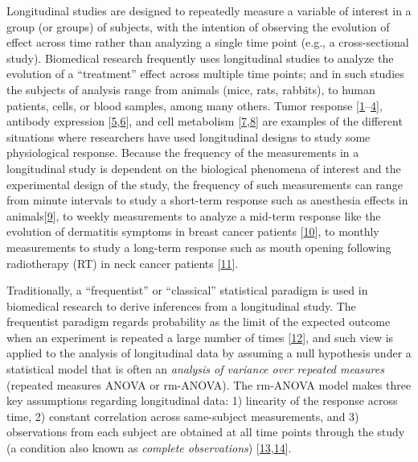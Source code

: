 \documentclass[
]{article}
\begin{document}
Longitudinal studies are designed to repeatedly measure a variable of interest in a group (or groups) of subjects, with the intention of observing the evolution of effect across time rather than analyzing a single time point (e.g., a cross-sectional study). Biomedical research frequently uses longitudinal studies to analyze the evolution of a ``treatment'' effect across multiple time points; and in such studies the subjects of analysis range from animals (mice, rats, rabbits), to human patients, cells, or blood samples, among many others. Tumor response {[}\protect\hyperlink{ref-roblyer2011}{1}--\protect\hyperlink{ref-demidov2018}{4}{]}, antibody expression {[}\protect\hyperlink{ref-ritter2001}{5},\protect\hyperlink{ref-roth2017}{6}{]}, and cell metabolism {[}\protect\hyperlink{ref-jones2018}{7},\protect\hyperlink{ref-skala2010}{8}{]} are examples of the different situations where researchers have used longitudinal designs to study some physiological response. Because the frequency of the measurements in a longitudinal study is dependent on the biological phenomena of interest and the experimental design of the study, the frequency of such measurements can range from minute intervals to study a short-term response such as anesthesia effects in animals{[}\protect\hyperlink{ref-greening2018}{9}{]}, to weekly measurements to analyze a mid-term response like the evolution of dermatitis symptoms in breast cancer patients {[}\protect\hyperlink{ref-sio2016}{10}{]}, to monthly measurements to study a long-term response such as mouth opening following radiotherapy (RT) in neck cancer patients {[}\protect\hyperlink{ref-kamstra2015}{11}{]}.

Traditionally, a ``frequentist'' or ``classical'' statistical paradigm is used in biomedical research to derive inferences from a longitudinal study. The frequentist paradigm regards probability as the limit of the expected outcome when an experiment is repeated a large number of times {[}\protect\hyperlink{ref-wagenmakers2008}{12}{]}, and such view is applied to the analysis of longitudinal data by assuming a null hypothesis under a statistical model that is often an \emph{analysis of variance over repeated measures} (repeated measures ANOVA or rm-ANOVA). The rm-ANOVA model makes three key assumptions regarding longitudinal data: 1) linearity of the response across time, 2) constant correlation across same-subject measurements, and 3) observations from each subject are obtained at all time points through the study (a condition also known as \emph{complete observations}) {[}\protect\hyperlink{ref-gueorguieva2004}{13},\protect\hyperlink{ref-schober2018}{14}{]}.
\end{document}
